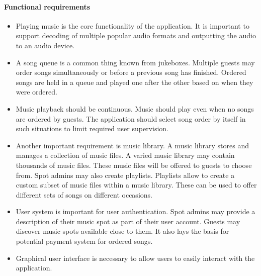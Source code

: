 \paragraph{Functional requirements}
\begin{itemize}
    \item Playing music is the core functionality of the application. It is important to support decoding of multiple popular audio formats and outputting the audio to an audio device.
    \item A song queue is a common thing known from jukeboxes. Multiple guests may order songs simultaneously or before a previous song has finished. Ordered songs are held in a queue and played one after the other based on when they were ordered.
    \item Music playback should be continuous. Music should play even when no songs are ordered by guests. The application should select song order by itself in such situations to limit required user supervision.
    \item Another important requirement is music library. A music library stores and manages a collection of music files. A varied music library may contain thousands of music files. These music files will be offered to guests to choose from. Spot admins may also create playlists. Playlists allow to create a custom subset of music files within a music library. These can be used to offer different sets of songs on different occasions.
    \item User system is important for user authentication. Spot admins may provide a description of their music spot as part of their user account. Guests may discover music spots available close to them. It also lays the basis for potential payment system for ordered songs.
    \item Graphical user interface is necessary to allow users to easily interact with the application.
\end{itemize}

